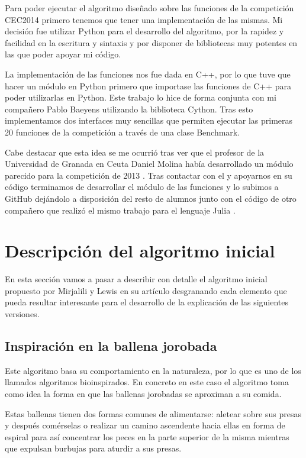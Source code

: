 \documentclass[12pt,a4paper]{article}
\begin{document}
		Para poder ejecutar el algoritmo diseñado sobre las funciones de la competición CEC2014 primero tenemos que tener una implementación de las mismas. Mi decisión fue utilizar Python para el desarrollo del algoritmo, por la rapidez y facilidad en la escritura y sintaxis y por disponer de bibliotecas muy potentes en las que poder apoyar mi código.
	
		La implementación de las funciones nos fue dada en C++, por lo que tuve que hacer un módulo en Python primero que importase las funciones de C++ para poder utilizarlas en Python. Este trabajo lo hice de forma conjunta con mi compañero Pablo Baeyens utilizando la biblioteca Cython. Tras esto implementamos dos interfaces muy sencillas que permiten ejecutar las primeras 20 funciones de la competición a través de una clase Benchmark.
		
		Cabe destacar que esta idea se me ocurrió tras ver que el profesor de la Universidad de Granada en Ceuta Daniel Molina había desarrollado un módulo parecido para la competición de 2013 \cite{danielMolinaCEC2013}. Tras contactar con el y apoyarnos en su código terminamos de desarrollar el módulo de las funciones y lo subimos a GitHub dejándolo a disposición del resto de alumnos junto con el código de otro compañero que realizó el mismo trabajo para el lenguaje Julia \cite{cec2014github}.

	\newpage

	\section{Descripción del algoritmo inicial}
	\label{sec:descripcionAlgoritmoInicial}
	
	En esta sección vamos a pasar a describir con detalle el algoritmo inicial propuesto por Mirjalili y Lewis en su artículo \cite{paperWOA} desgranando cada elemento que pueda resultar interesante para el desarrollo de la explicación de las siguientes versiones.
	
	\subsection{Inspiración en la ballena jorobada}
	
	Este algoritmo basa su comportamiento en la naturaleza, por lo que es uno de los llamados algoritmos bioinspirados. En concreto en este caso el algoritmo toma como idea la forma en que las ballenas jorobadas se aproximan a su comida.
	
	Estas ballenas tienen dos formas comunes de alimentarse: aletear sobre sus presas y después comérselas o realizar un camino ascendente hacia ellas en forma de espiral para así concentrar los peces en la parte superior de la misma mientras que expulsan burbujas para aturdir a sus presas.
	
\end{document}
